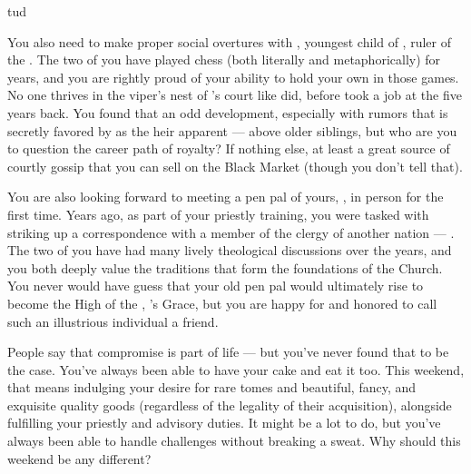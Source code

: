 tud\documentclass[char]{GL2020}
\begin{document}
You also need to make proper social overtures with \cPrince{\full}, youngest child of \cQueen{\full}, ruler of the \pFarm{}. The two of you have played chess (both literally and metaphorically) for years, and you are rightly proud of your ability to hold your own in those games. No one thrives in the viper’s nest of \cQueen{}’s court like \cPrince{} did, before \cPrince{} took a job at the \pSchool{} five years back. You found that an odd development, especially with rumors that \cPrince{} is secretly favored by \cQueen{} as the heir apparent — above \cPrince{\their} older siblings, but who are you to question the career path of royalty? If nothing else, at least \cPrince{\they} \cPrince{\are} a great source of courtly gossip that you can sell on the Black Market (though you don't tell \cPrince{\them} that). 

You are also looking forward to meeting a pen pal of yours, \cAntiChup{\full}, in person for the first time. Years ago, as part of your priestly training, you were tasked with striking up a correspondence with a member of the clergy of another nation — \cAntiChup{}. The two of you have had many lively theological discussions over the years, and you both deeply value the traditions that form the foundations of the Church. You never would have guess that your old pen pal would ultimately rise to become the High \cAntiChup{\Cleric} of the \pTech{}, \cTechGod{}’s Grace, but you are happy for \cAntiChup{\them} and honored to call such an illustrious individual a friend.

People say that compromise is part of life — but you've never found that to be the case. You've always been able to have your cake and eat it too. This weekend, that means indulging your desire for rare tomes and beautiful, fancy, and exquisite quality goods (regardless of the legality of their acquisition), alongside fulfilling your priestly and advisory duties. It might be a lot to do, but you've always been able to handle challenges without breaking a sweat. Why should this weekend be any different?
\end{document}
